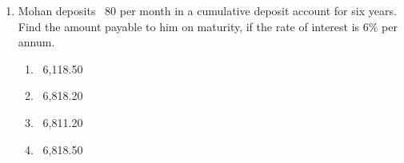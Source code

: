 \begin{enumerate}[label=(\roman*)]
    \item Mohan deposits \rupee~80 per month in a cumulative deposit account
        for six years. Find the amount payable to him on maturity, if the rate 
        of interest is 6\% per annum.

        \begin{multicols}{2}
        \begin{enumerate}[label=(\alph*)]
            \item \rupee~6,118.50 
            \item \rupee~6,818.20 
            \item \rupee~6,811.20
            \item \rupee~6,818.50
        \end{enumerate}
        \end{multicols}

\end{enumerate}

